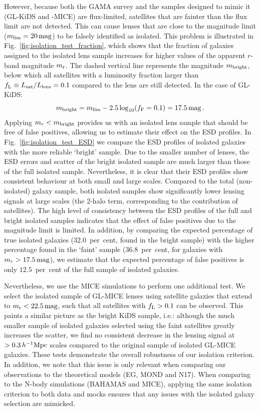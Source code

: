 \documentclass[usenatbib]{mnras}
\newcommand{\hMpc}{\, h^{-1}{\rm{Mpc}} }
\newcommand{\magn}{\, {\rm mag} }
\newcommand{\un}[1]{_{\rm #1}}
\begin{document}
However, because both the GAMA survey and the samples designed to mimic it (GL-KiDS and -MICE) are flux-limited, satellites that are fainter than the flux limit are not detected. This can cause lenses that are close to the magnitude limit ($m\un{lim}=20 \magn$) to be falsely identified as isolated. This problem is illustrated in Fig.~\ref{fig:isolation_test_fraction}, which shows that the fraction of galaxies assigned to the isolated lens sample increases for higher values of the apparent $r$-band magnitude $m\un{r}$. The dashed vertical line represents the magnitude $m\un{bright}$, below which all satellites with a luminosity fraction larger than $f\un{L} \equiv L\un{sat}/L\un{lens}=0.1$ compared to the lens are still detected. In the case of GL-KiDS:
\begin{equation}
	m\un{bright} = m\un{lim} - 2.5 \log_{10}(f\un{F}=0.1) = 17.5 \magn \, .
\end{equation}
Applying $m_r < m\un{bright}$ provides us with an isolated lens sample that should be free of false positives, allowing us to estimate their effect on the ESD profiles. In Fig.~\ref{fig:isolation_test_ESD} we compare the ESD profiles of isolated galaxies with the more reliable `bright' sample. Due to the smaller number of lenses, the ESD errors and scatter of the bright isolated sample are much larger than those of the full isolated sample. Nevertheless, it is clear that their ESD profiles show consistent behaviour at both small and large scales. Compared to the total (non-isolated) galaxy sample, both isolated samples show significantly lower lensing signals at large scales (the 2-halo term, corresponding to the contribution of satellites). The high level of consistency between the ESD profiles of the full and bright isolated samples indicates that the effect of false positives due to the magnitude limit is limited. In addition, by comparing the expected percentage of true isolated galaxies ($32.0$~per~cent, found in the bright sample) with the higher percentage found in the `faint' sample ($36.8$~per~cent, for galaxies with $m_r > 17.5 \magn$), we estimate that the expected percentage of false positives is only $12.5$~per~cent of the full sample of isolated galaxies.

Nevertheless, we use the MICE simulations to perform one additional test. We select the isolated sample of GL-MICE lenses using satellite galaxies that extend to $m\un{r}<22.5 \magn$, such that all satellites with $f\un{L}>0.1$ can be observed. This paints a similar picture as the bright KiDS sample, i.e.: although the much smaller sample of isolated galaxies selected using the faint satellites greatly increases the scatter, we find no consistent decrease in the lensing signal at $>0.3\hMpc$ scales compared to the original sample of isolated GL-MICE galaxies. These tests demonstrate the overall robustness of our isolation criterion. In addition, we note that this issue is only relevant when comparing our observations to the theoretical models (EG, MOND and N17). When comparing to the N-body simulations (BAHAMAS and MICE), applying the same isolation criterion to both data and mocks ensures that any issues with the isolated galaxy selection are mimicked.
\end{document}
